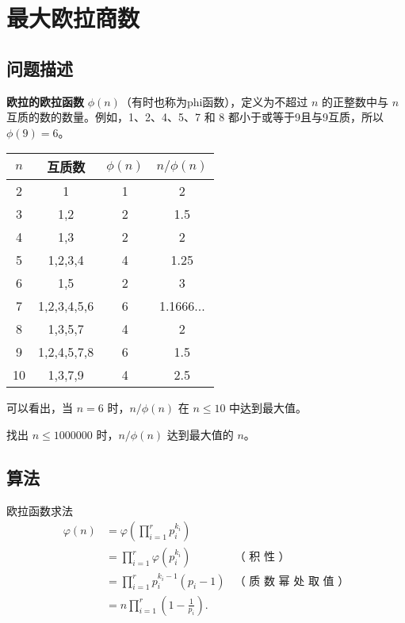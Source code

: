 \section{最大欧拉商数}
\subsection{问题描述}
\begin{tcolorbox}
	\textbf{欧拉的欧拉函数} \(\phi(n)\)（有时也称为phi函数），定义为不超过 \(n\) 的正整数中与 \(n\) 互质的数的数量。例如，1、2、4、5、7 和 8 都小于或等于9且与9互质，所以 \(\phi(9)=6\)。

	\begin{center}
		\begin{tabular}{|c|c|c|c|}
			\hline
			\(n\) & 互质数      & \(\phi(n)\) & \(n/\phi(n)\) \\
			\hline
			2     & 1           & 1           & 2             \\
			3     & 1,2         & 2           & 1.5           \\
			4     & 1,3         & 2           & 2             \\
			5     & 1,2,3,4     & 4           & 1.25          \\
			6     & 1,5         & 2           & 3             \\
			7     & 1,2,3,4,5,6 & 6           & 1.1666...     \\
			8     & 1,3,5,7     & 4           & 2             \\
			9     & 1,2,4,5,7,8 & 6           & 1.5           \\
			10    & 1,3,7,9     & 4           & 2.5           \\
			\hline
		\end{tabular}
	\end{center}

	可以看出，当 \(n=6\) 时，\(n/\phi(n)\) 在 \(n \leq 10\) 中达到最大值。

	找出 \(n \leq \num{1000000}\) 时，\(n/\phi(n)\) 达到最大值的 \(n\)。
\end{tcolorbox}

\subsection{算法}
欧拉函数求法
\begin{align*}
	\varphi (n) & =\varphi \left(\prod _{i=1}^{r}p_{i}^{k_{i}}\right)  \\
	            & =\prod _{i=1}^{r}\varphi \left(p_{i}^{k_{i}}\right)
	            & {\text{（ 积 性 ）}}                                 \\
	            & =\prod _{i=1}^{r}p_{i}^{k_{i}-1}(p_{i}-1)
	            & {\text{（ 质 数 幂 处 取 值 ）}}                     \\
	            & =n\prod _{i=1}^{r}\left(1-{\frac {1}{p_{i}}}\right).
\end{align*}

